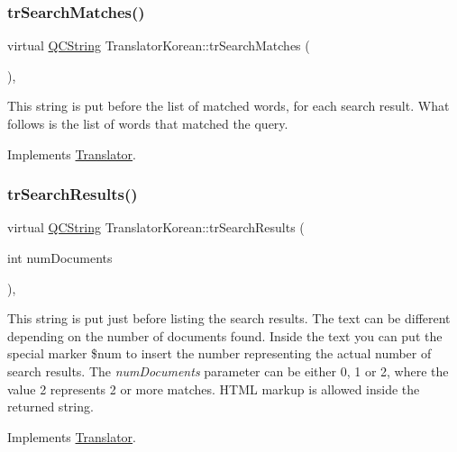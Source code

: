 \subsubsection{\texorpdfstring{trSearchMatches()}{trSearchMatches()}}
{\footnotesize\ttfamily virtual \mbox{\hyperlink{class_q_c_string}{Q\+C\+String}} Translator\+Korean\+::tr\+Search\+Matches (\begin{DoxyParamCaption}{ }\end{DoxyParamCaption})\hspace{0.3cm}{\ttfamily [inline]}, {\ttfamily [virtual]}}

This string is put before the list of matched words, for each search result. What follows is the list of words that matched the query. 

Implements \mbox{\hyperlink{class_translator}{Translator}}.

\mbox{\label{class_translator_korean_a3ee64a5e4635a5d9a428a0d8acfcf0ea}} 
\subsubsection{\texorpdfstring{trSearchResults()}{trSearchResults()}}
{\footnotesize\ttfamily virtual \mbox{\hyperlink{class_q_c_string}{Q\+C\+String}} Translator\+Korean\+::tr\+Search\+Results (\begin{DoxyParamCaption}\item[{int}]{num\+Documents }\end{DoxyParamCaption})\hspace{0.3cm}{\ttfamily [inline]}, {\ttfamily [virtual]}}

This string is put just before listing the search results. The text can be different depending on the number of documents found. Inside the text you can put the special marker \$num to insert the number representing the actual number of search results. The {\itshape num\+Documents} parameter can be either 0, 1 or 2, where the value 2 represents 2 or more matches. H\+T\+ML markup is allowed inside the returned string. 

Implements \mbox{\hyperlink{class_translator}{Translator}}.

\mbox{\label{class_translator_korean_aa8be7c0f7412661dc5ae06c1772806f7}} 
